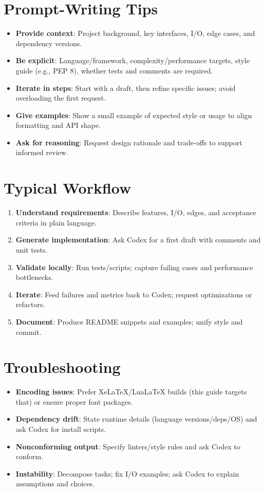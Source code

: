 \documentclass{article}
\begin{document}
\section{Prompt-Writing Tips}
\begin{itemize}
  \item \textbf{Provide context}: Project background, key interfaces, I/O, edge cases, and dependency versions.
  \item \textbf{Be explicit}: Language/framework, complexity/performance targets, style guide (e.g., PEP 8), whether tests and comments are required.
  \item \textbf{Iterate in steps}: Start with a draft, then refine specific issues; avoid overloading the first request.
  \item \textbf{Give examples}: Show a small example of expected style or usage to align formatting and API shape.
  \item \textbf{Ask for reasoning}: Request design rationale and trade-offs to support informed review.
\end{itemize}

\section{Typical Workflow}
\begin{enumerate}
  \item \textbf{Understand requirements}: Describe features, I/O, edges, and acceptance criteria in plain language.
  \item \textbf{Generate implementation}: Ask Codex for a first draft with comments and unit tests.
  \item \textbf{Validate locally}: Run tests/scripts; capture failing cases and performance bottlenecks.
  \item \textbf{Iterate}: Feed failures and metrics back to Codex; request optimizations or refactors.
  \item \textbf{Document}: Produce README snippets and examples; unify style and commit.
\end{enumerate}

\section{Troubleshooting}
\begin{itemize}
  \item \textbf{Encoding issues}: Prefer XeLaTeX/LuaLaTeX builds (this guide targets that) or ensure proper font packages.
  \item \textbf{Dependency drift}: State runtime details (language versions/deps/OS) and ask Codex for install scripts.
  \item \textbf{Nonconforming output}: Specify linters/style rules and ask Codex to conform.
  \item \textbf{Instability}: Decompose tasks; fix I/O examples; ask Codex to explain assumptions and choices.
\end{itemize}
\end{document}
